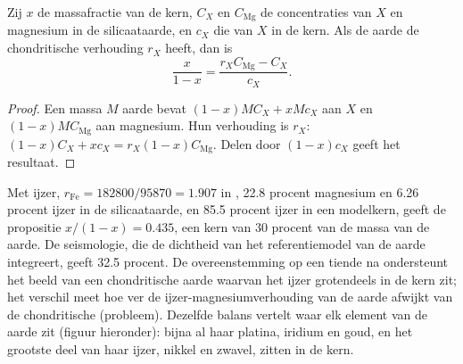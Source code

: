 \begin{proposition}
\label{prop:b2:elements-in-the-earth:core}
Zij $x$ de massafractie van de kern, $C_X$ en $C_{\mathrm{Mg}}$ de
concentraties van $X$ en magnesium in de silicaataarde, en $c_X$ die van $X$ in
de kern. Als de aarde de chondritische verhouding $r_X$ heeft, dan is
\[
  \frac{x}{1-x} = \frac{r_X C_{\mathrm{Mg}} - C_X}{c_X}.
\]
\end{proposition}

\begin{proof}
Een massa $M$ aarde bevat $(1-x)MC_X + xMc_X$ aan $X$ en $(1-x)MC_{\mathrm{Mg}}$ aan
magnesium. Hun verhouding is $r_X$:
$(1-x)C_X + xc_X = r_X(1-x)C_{\mathrm{Mg}}$. Delen door $(1-x)c_X$ geeft het
resultaat.
\end{proof}

Met ijzer, $r_{\mathrm{Fe}} = \num{182800}/\num{95870} = 1.907$ in ,
22.8 procent magnesium en 6.26 procent ijzer in de silicaataarde, en 85.5
procent ijzer in een modelkern, geeft de propositie $x/(1-x) = 0.435$, een kern van 30
procent van de massa van de aarde. De seismologie, die de dichtheid van het
referentiemodel van de aarde integreert, geeft 32.5 procent. De overeenstemming op een tiende na
ondersteunt het beeld van een chondritische aarde waarvan het ijzer grotendeels in de kern zit; het
verschil meet hoe ver de ijzer-magnesiumverhouding van de aarde afwijkt van de
chondritische (probleem). Dezelfde balans vertelt waar elk element van de aarde zit
(figuur hieronder): bijna al haar platina, iridium en goud, en het grootste deel van haar ijzer,
nikkel en zwavel, zitten in de kern.

\begin{omfigure}
\centering
{}
\par{}
\end{omfigure}

